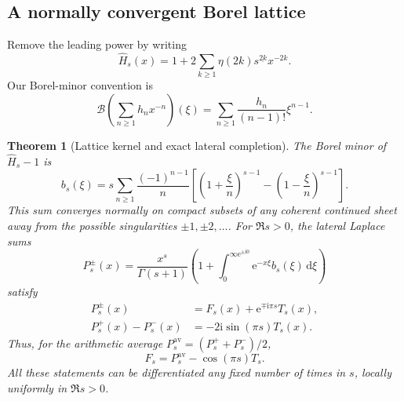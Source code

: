 \documentclass[11pt,a4paper]{article}
\newtheorem{theorem}{Theorem}[section]
\theoremstyle{definition}\newtheorem{definition}[theorem]{Definition}
\theoremstyle{remark}\newtheorem{remark}[theorem]{Remark}
\newcommand{\Borel}{\mathcal B}
\newcommand{\dd}{\,\mathrm d}
\newcommand{\ii}{\mathrm i}
\newcommand{\ee}{\mathrm e}
\numberwithin{equation}{section}
\begin{document}
\subsection{A normally convergent Borel lattice}

Remove the leading power by writing
\begin{equation}\label{eq:Hformal}
 \widehat H_s(x)=1+2\sum_{k\ge1}\eta(2k)
                    s^{\underline{2k}}x^{-2k}.
\end{equation}
Our Borel-minor convention is
\begin{equation}\label{eq:Bconvention}
 \Borel\!\left(\sum_{n\ge1}h_nx^{-n}\right)(\xi)
       =\sum_{n\ge1}\frac{h_n}{(n-1)!}\xi^{n-1}.
\end{equation}

\begin{theorem}[Lattice kernel and exact lateral completion]\label{thm:lattice}
The Borel minor of $\widehat H_s-1$ is
\begin{equation}\label{eq:bs}
 b_s(\xi)=s\sum_{n\ge1}\frac{(-1)^{n-1}}{n}
       \left[\left(1+\frac\xi n\right)^{s-1}
             -\left(1-\frac\xi n\right)^{s-1}\right].
\end{equation}
This sum converges normally on compact subsets of any coherent continued
sheet away from the possible singularities $\pm1,\pm2,\ldots$. For
$\Re s>0$, the lateral Laplace sums
\begin{equation}\label{eq:Ps}
 P_s^\pm(x)=\frac{x^s}{\Gamma(s+1)}
       \left(1+\int_{0}^{\infty\ee^{\pm\ii0}}
                         \ee^{-x\xi}b_s(\xi)\dd\xi\right)
\end{equation}
satisfy
\begin{align}
 P_s^\pm(x)&=F_s(x)+\ee^{\mp\ii\pi s}T_s(x),\label{eq:completion}\\
 P_s^+(x)-P_s^-(x)&=-2\ii\sin(\pi s)T_s(x).\label{eq:jump}
\end{align}
Thus, for the arithmetic average $P_s^{\mathrm{av}}=(P_s^++P_s^-)/2$,
\begin{equation}\label{eq:average}
 F_s=P_s^{\mathrm{av}}-\cos(\pi s)T_s.
\end{equation}
All these statements can be differentiated any fixed number of times in
$s$, locally uniformly in $\Re s>0$.
\end{theorem}
\end{document}
